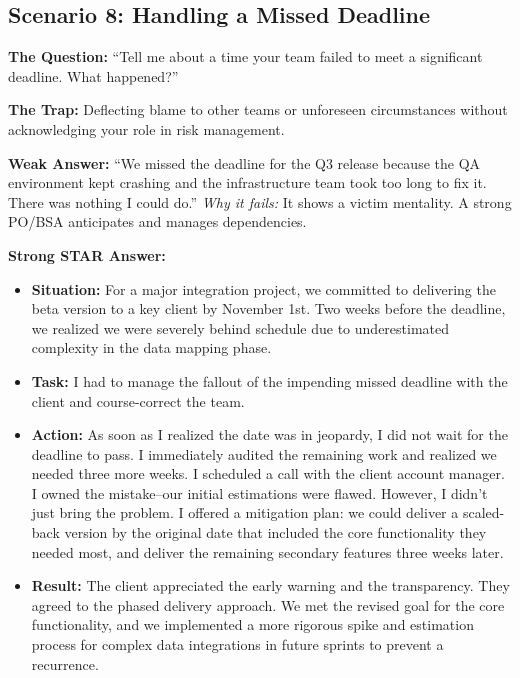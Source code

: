 \documentclass[
  11pt,
  openany,
  oneside]{book}
\providecommand{\tightlist}{%
  \setlength{\itemsep}{0pt}\setlength{\parskip}{0pt}}
\begin{document}
\subsection{Scenario 8: Handling a Missed
Deadline}\label{scenario-8-handling-a-missed-deadline}

\textbf{The Question:} ``Tell me about a time your team failed to meet a
significant deadline. What happened?''

\textbf{The Trap:} Deflecting blame to other teams or unforeseen
circumstances without acknowledging your role in risk management.

\textbf{Weak Answer:} ``We missed the deadline for the Q3 release
because the QA environment kept crashing and the infrastructure team
took too long to fix it. There was nothing I could do.'' \emph{Why it
fails:} It shows a victim mentality. A strong PO/BSA anticipates and
manages dependencies.

\textbf{Strong STAR Answer:}

\begin{itemize}
\tightlist
\item
  \textbf{Situation:} For a major integration project, we committed to
  delivering the beta version to a key client by November 1st. Two weeks
  before the deadline, we realized we were severely behind schedule due
  to underestimated complexity in the data mapping phase.
\item
  \textbf{Task:} I had to manage the fallout of the impending missed
  deadline with the client and course-correct the team.
\item
  \textbf{Action:} As soon as I realized the date was in jeopardy, I did
  not wait for the deadline to pass. I immediately audited the remaining
  work and realized we needed three more weeks. I scheduled a call with
  the client account manager. I owned the mistake--our initial
  estimations were flawed. However, I didn't just bring the problem. I
  offered a mitigation plan: we could deliver a scaled-back version by
  the original date that included the core functionality they needed
  most, and deliver the remaining secondary features three weeks later.
\item
  \textbf{Result:} The client appreciated the early warning and the
  transparency. They agreed to the phased delivery approach. We met the
  revised goal for the core functionality, and we implemented a more
  rigorous spike and estimation process for complex data integrations in
  future sprints to prevent a recurrence.
\end{itemize}
\end{document}
